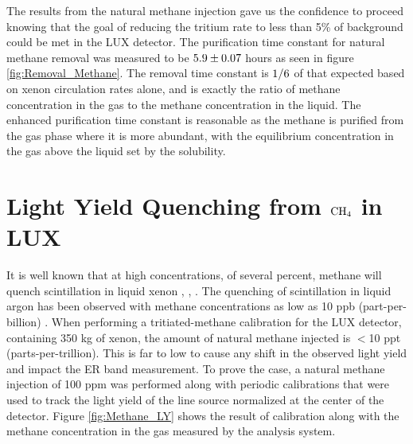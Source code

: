 The results from the natural methane injection gave us the confidence to proceed knowing that the goal of reducing the tritium rate to less than 5\% of background could be met in the LUX detector. The purification time constant for natural methane removal was measured to be $\rm 5.9 \pm 0.07$ hours as seen in figure \ref{fig:Removal_Methane}. The removal time constant is $\rm 1/6$ of that expected based on xenon circulation rates alone, and is exactly the ratio of methane concentration in the gas to the methane concentration in the liquid. The enhanced purification time constant is reasonable as the methane is purified from the gas phase where it is more abundant, with the equilibrium concentration in the gas above the liquid set by the solubility.



\section{Light Yield Quenching from $\rm CH_4$ in LUX}

It is well known that at high concentrations, of several percent, methane will quench scintillation in liquid xenon \cite{bondar2006two}, \cite{Kirill_Methane}, \cite{Shibamura} \cite{Xe_CH4_Theory}. The quenching of scintillation in liquid argon has been observed with methane concentrations as low as 10 ppb (part-per-billion) \cite{Ar_CH4}. When performing a tritiated-methane calibration for the LUX detector, containing 350 kg of xenon, the amount of natural methane injected is $<$10 ppt (parts-per-trillion). This is far to low to cause any shift in the observed light yield and impact the ER band measurement. To prove the case, a natural methane injection of 100 ppm was performed along with periodic \KrCal calibrations that were used to track the light yield of the line source normalized at the center of the detector. Figure \ref{fig:Methane_LY} shows the result of \KrCal calibration along with the methane concentration in the gas measured by the analysis system.

